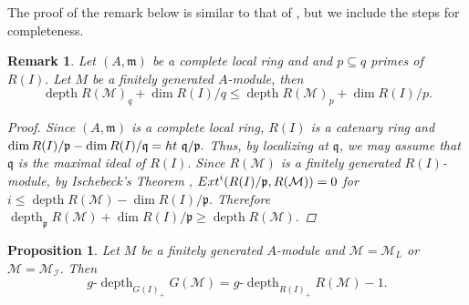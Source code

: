 \documentclass[11pt,reqno]{amsart}
\newtheorem{proposition}[theorem]{Proposition}
\newtheorem{remark}[theorem]{Remark}
\theoremstyle{definition}
\newcommand{\m}{\mathfrak m}
\newcommand{\p}{\mathfrak p}
\newcommand{\q}{\mathfrak q}
\def\Ext{\rm{Ext}}
\def\M{{\mathcal M}}
\def\I{{\mathcal I}}
\DeclareMathOperator{\depth}{depth}
\numberwithin{equation}{section}
\begin{document}
    The proof of the remark below is similar to that of \cite[Remark 2.2]{HM94}, but we include the steps for completeness.
	\begin{remark}\label{remark_6.3}
	    Let $(A,\m)$ be a complete local ring and and $p\subseteq q$ primes of $R(I).$ Let $M$ be a finitely generated $A$-module, then 
        $$
        \depth R(\M)_q+\dim R(I)/q\leq \depth R(\M)_p+\dim R(I)/p.
        $$
        \begin{proof}
            Since $(A,\m)$ is a complete local ring, $R(I)$ is a catenary ring and  $\dim R(I)/\p-\dim R(I)/\q= \rm{ht}~\q/\p.$ Thus, by localizing at $\q$, we may assume that $\q$ is the maximal ideal of $R(I).$ Since $R(\M)$ is a finitely generated $R(I)$-module, by Ischebeck's Theorem \cite[Theorem 17.1]{Mat}, $\Ext^i(R(I)/\p,R(\M))=0$ for $i\leq \depth R(\M)- \dim R(I)/\p.$ Therefore $\depth_\p R(\M)+ \dim R(I)/\p\geq \depth R(\M).$
        \end{proof}
	\end{remark}
	\begin{proposition}\label{Appendix-proposition-main-1}
		Let $M$ be a finitely generated $A$-module and $\M=\M_L$ or $\M=\M_\I.$ Then 
		$$g\text{-} \depth_{G(I)_+} G(\M)=g\text{-}\depth_{R(I)_+}R(\M)-1.$$
	\end{proposition}
\end{document}
